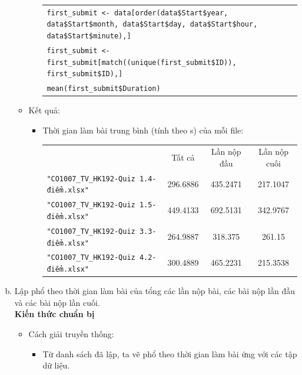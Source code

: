 \documentclass[a4paper]{article}
\theoremstyle{definition}
\begin{document}
\begin{enumerate}[a)]
\begin{itemize}
\begin{itemize}
\begin{center}
\begin{tabular}{p{13cm}}
                    \texttt{first\_submit <- data[order(data\$Start\$year, data\$Start\$month, data\$Start\$day, data\$Start\$hour, data\$Start\$minute),]} \\
                    \texttt{first\_submit <- first\_submit[match((unique(first\_submit\$ID)), first\_submit\$ID),]} \\
                    \texttt{mean(first\_submit\$Duration)}
                \end{tabular}
            \end{center}
        \end{itemize}
        \item Kết quả:
        \begin{itemize}
            \item Thời gian làm bài trung bình (tính theo s) của mỗi file:
            \begin{center}
                \begin{tabular}{l c c c}
                     & Tất cả & Lần nộp đầu & Lần nộp cuối\\
                     \texttt{"CO1007\_TV\_HK192-Quiz 1.4-điểm.xlsx"} & 296.6886 & 435.2471 & 217.1047 \\ 
                     \texttt{"CO1007\_TV\_HK192-Quiz 1.5-điểm.xlsx"} & 449.4133 & 692.5131 & 342.9767\\ 
                     \texttt{"CO1007\_TV\_HK192-Quiz 3.3-điểm.xlsx"} & 264.9887 & 318.375 & 261.15\\ 
                     \texttt{"CO1007\_TV\_HK192-Quiz 4.2-điểm.xlsx"} & 300.4889 & 465.2231 & 215.3538\\ 
                \end{tabular}
            \end{center}
        \end{itemize}
    \end{itemize}
    \bf\item {Lập phổ theo thời gian làm bài của tổng các lần nộp bài, các bài nộp lần đầu và các bài nộp lần cuối.}\\[6pt]
    \bf Kiến thức chuẩn bị\normalfont
    \begin{itemize}
        \item Cách giải truyền thống:
        \begin{itemize}
            \item Từ danh sách đã lập, ta vẽ phổ theo thời gian làm bài ứng với các tập dữ liệu.
        \end{itemize}
    \end{itemize}

\end{enumerate}
\end{document}
